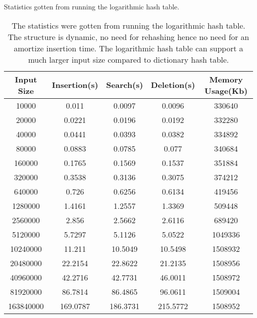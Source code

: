 \documentclass[a4paper,12pt, openany]{book}
\begin{document}
	
\newpage
\begin{table}[H]
	\begin{center}
		\caption{Statistics  gotten from running the logarithmic hash table.     }
		\label{tab:extendible}
		\begin{tabular}{|c|c|c|c|c|} %
			\hline
			\textbf{Input Size} & \textbf{Insertion(s)}  & \textbf{Search(s)} & \textbf{Deletion(s)} &  \textbf{Memory Usage(Kb)}\\
			\hline
			
			10000	&	0.011	&	0.0097	&	0.0096	&	330640\\
			20000	&	0.0221	&	0.0196	&	0.0192	&	332280\\
			40000	&	0.0441	&	0.0393	&	0.0382	&	334892\\
			80000	&	0.0883	&	0.0785	&	0.077	&	340684\\
			160000	&	0.1765	&	0.1569	&	0.1537	&	351884\\
			320000	&	0.3538	&	0.3136	&	0.3075	&	374212\\
			640000	&	0.726	&	0.6256	&	0.6134	&	419456\\
			1280000	&	1.4161	&	1.2557	&	1.3369	&	509448\\
			2560000	&	2.856	&	2.5662	&	2.6116	&	689420\\
			5120000		&	5.7297	&	5.1126	&	5.0522	&	1049336\\
			10240000	&	11.211	&	10.5049	&	10.5498	&	1508932\\
			20480000	&	22.2154	&	22.8622	&	21.2135	&	1508956\\
			40960000	&	42.2716	&	42.7731	&	46.0011	&	1508972\\
			81920000	&	86.7814	&	86.4865	&	96.0611	&	1509004\\
			163840000	&	169.0787	&	186.3731	&	215.5772	&	1508952\\
			\hline
		\end{tabular}\bigbreak
\caption*{The statistics were gotten from running the logarithmic hash table. The structure is dynamic, no need for rehashing hence no need for an amortize insertion time. The logarithmic hash table can support a much larger input size compared to dictionary hash table.}
\end{center}
\end{table}
\end{document}
